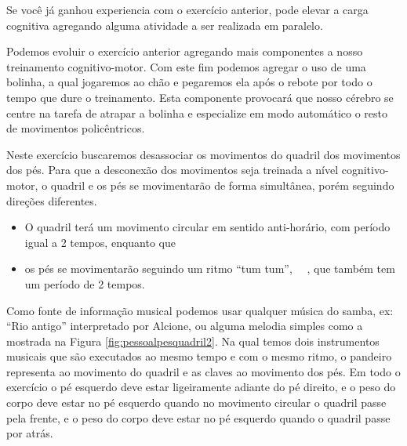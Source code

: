 Se você já ganhou experiencia com o exercício anterior, 
pode elevar a carga cognitiva agregando alguma atividade a ser realizada em paralelo.

\begin{example}
Podemos evoluir o exercício anterior agregando mais componentes a nosso treinamento cognitivo-motor.
Com este fim podemos agregar o uso de uma bolinha, a qual
jogaremos ao chão e pegaremos ela após o rebote por todo o tempo que dure o treinamento.
Esta componente provocará que nosso cérebro se centre na tarefa de atrapar a bolinha  
e especialize em modo automático o resto de movimentos policêntricos.
\end{example}


\begin{example}
Neste exercício buscaremos desassociar os movimentos do quadril
dos movimentos dos pés.
Para que a desconexão dos movimentos seja treinada a nível cognitivo-motor,
 o quadril e os pés se movimentarão de forma simultânea,
porém seguindo direções diferentes.
\begin{itemize}
\item O quadril terá um movimento circular em sentido anti-horário, com período igual a 2 tempos, 
enquanto que 
\item os pés se movimentarão seguindo um ritmo ``tum tum'', 
\leftrepeat~\Vier\Vier~\rightrepeat, que também tem um período de 2 tempos.
\end{itemize}
Como fonte de informação musical podemos usar qualquer música do samba,
ex: ``Rio antigo'' interpretado por Alcione,
ou alguma melodia simples como a mostrada na Figura \ref{fig:pessoalpesquadril2}.
Na qual temos dois instrumentos musicais que são executados ao mesmo tempo e com o mesmo ritmo,
o pandeiro representa ao movimento do quadril e as claves ao movimento dos pés.
Em todo o exercício o pé esquerdo deve estar ligeiramente adiante do pé direito,
e o peso do corpo deve estar no pé esquerdo quando no movimento circular o quadril passe pela frente,
e o peso do corpo deve estar no pé esquerdo quando o quadril passe por atrás. 
\end{example}

